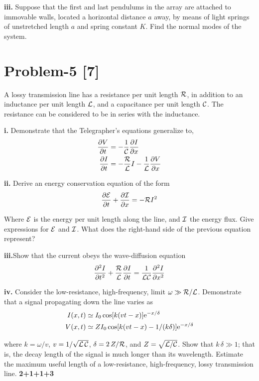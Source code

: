 \documentclass[12pt, a4paper]{article}
\begin{document}
\textbf{iii.} Suppose that the first and last pendulums in the array are attached to
immovable walls, located a horizontal distance $a$ away, by means of light springs of 
unstretched length $a$ and spring constant $K$. Find the normal modes of the system.


\section*{Problem-5 \hfill \textbf{[7]}}

\noindent
A lossy transmission line has a resistance per unit length ${\cal R}$,
in addition to an inductance per unit length ${\cal L}$, and a capacitance per unit length 
${\cal C}$. The resistance can be considered to be in series with the inductance.

\textbf{i.} Demonstrate that the Telegrapher's equations generalize to,
\begin{align*}
    \frac{\partial V}{\partial t} &=-\frac{1}{\cal C}\frac{\partial I}{\partial x}\\  
    \frac{\partial I}{\partial t} &=-\frac{\cal R}{\cal L} I - \frac{1}{\cal L}\frac{\partial V}{\partial x}
\end{align*}

\textbf{ii.} Derive an energy conservation equation of the form
\begin{align*}
    \frac{\partial{\cal E}}{\partial t} + \frac{\partial {\cal I}}{\partial x} =- {\cal R}I^{2}
\end{align*}

Where ${\cal E}$ is the energy per unit length along the line, and ${\cal I}$ the energy flux. 
Give expressions for ${\cal E}$ and ${\cal I}$. What does the right-hand side of the previous 
equation represent?

\textbf{iii.}Show that the current obeys the wave-diffusion equation
\begin{align*}
    \frac{\partial^{2} I}{\partial t^{2}}+ \frac{\cal R}{\cal L}\frac{\partial I}{\partial t} = \frac{1}{{\cal L}{\cal C}}\frac{\partial^{2} I}{\partial x^{2}}
\end{align*}

\textbf{iv.} Consider the low-resistance, high-frequency, limit $\omega\gg {\cal R}/{\cal L}$.
Demonstrate that a signal propagating down the line varies as
\begin{align*}
    I(x,t) &\simeq I_0\cos[k(vt-x)]{\rm e}^{-x/\delta}\\	   
    V(x,t) &\simeq Z I_0\cos[k(vt-x)-1/(k\delta)]{\rm e}^{-x/\delta}
\end{align*}

where $k=\omega/v$, $v=1/\sqrt{{\cal L}\,{\cal C}}$, $\delta = 2\,Z/{\cal R}$, 
and $Z=\sqrt{{\cal L}/{\cal C}}$. Show that $k\,\delta \gg 1$; that is, 
the decay length of the signal is much longer than its wavelength. 
Estimate the maximum useful length of a low-resistance, high-frequency, lossy transmission line.
\hfill\textbf{2+1+1+3}\\
\end{document}
